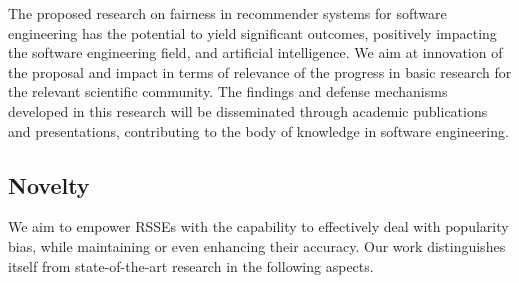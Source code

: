 













The proposed research on fairness %
in recommender systems for software engineering has the potential to yield significant outcomes, %
positively impacting the software engineering field, and artificial intelligence. We aim at innovation of the proposal and impact in terms of relevance of the progress in basic research for the relevant scientific community. %
The findings and defense mechanisms developed in this research will be disseminated through academic publications and presentations, contributing to the body of knowledge in software engineering. %




\subsection{Novelty}



We aim to empower RSSEs %
with the capability to effectively deal with popularity bias, while maintaining or even enhancing their accuracy. Our work distinguishes itself from state-of-the-art research in the following aspects.

